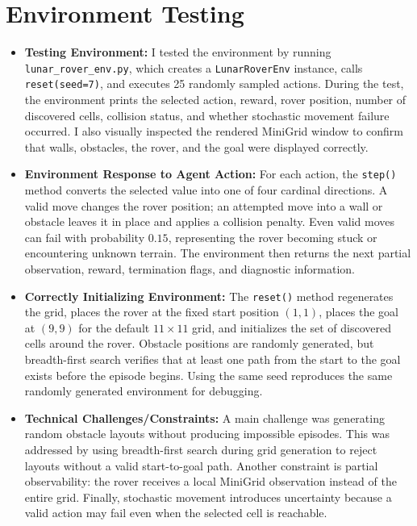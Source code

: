 \documentclass[12pt]{article}
\begin{document}
\section*{Environment Testing}
\begin{itemize}
    \item \textbf{Testing Environment:} I tested the environment by running \texttt{lunar\_rover\_env.py},
    which creates a \texttt{LunarRoverEnv} instance, calls \texttt{reset(seed=7)}, and executes 25 randomly sampled actions.
    During the test, the environment prints the selected action, reward, rover position, number of discovered cells, collision status, and whether stochastic movement failure occurred.
    I also visually inspected the rendered MiniGrid window to confirm that walls, obstacles, the rover, and the goal were displayed correctly.

    \item \textbf{Environment Response to Agent Action:} For each action, the \texttt{step()} method converts the selected value into one of four cardinal directions.
    A valid move changes the rover position; an attempted move into a wall or obstacle leaves it in place and applies a collision penalty.
    Even valid moves can fail with probability $0.15$, representing the rover becoming stuck or encountering unknown terrain.
    The environment then returns the next partial observation, reward, termination flags, and diagnostic information.

    \item \textbf{Correctly Initializing Environment:} The \texttt{reset()} method regenerates the grid, places the rover at the fixed start position $(1,1)$, places the goal at $(9,9)$ for the default $11 \times 11$ grid, and initializes the set of discovered cells around the rover.
    Obstacle positions are randomly generated, but breadth-first search verifies that at least one path from the start to the goal exists before the episode begins.
    Using the same seed reproduces the same randomly generated environment for debugging.

    \item \textbf{Technical Challenges/Constraints:} A main challenge was generating random obstacle layouts without producing impossible episodes.
    This was addressed by using breadth-first search during grid generation to reject layouts without a valid start-to-goal path.
    Another constraint is partial observability: the rover receives a local MiniGrid observation instead of the entire grid.
    Finally, stochastic movement introduces uncertainty because a valid action may fail even when the selected cell is reachable.
\end{itemize}
\end{document}
